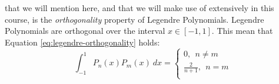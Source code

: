 that we will mention here, and that we will make use of extensively in this course, is the \emph{orthogonality} property of Legendre Polynomials.
Legendre Polynomials are orthogonal over the interval $x \in [-1,1]$.  This mean that Equation \ref{eq:legendre-orthogonality} holds:
\begin{equation}
\int_{-1}^{1} P_n(x) P_m(x) \ dx = 
\begin{cases}
0, \ \ n \ne m \\
\frac{2}{n+1}, \ \ n = m \\
\end{cases}
\label{eq:legendre-orthogonality}
\end{equation}

